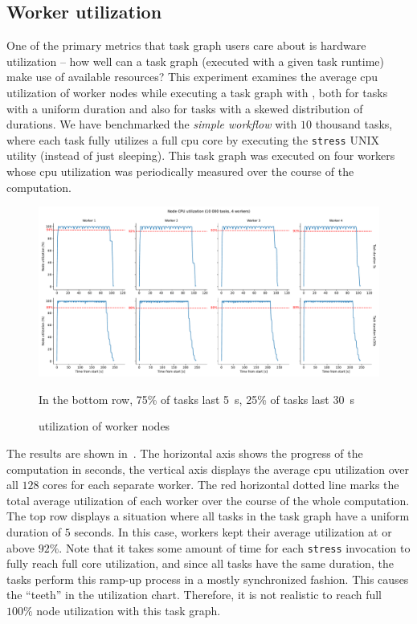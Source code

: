 \subsection{Worker  utilization}
\label{sec:hq-cpu-utilization}
One of the primary metrics that task graph users care about is hardware utilization -- how well can
a task graph (executed with a given task runtime) make use of available resources? This experiment
examines the average \gls{cpu} utilization of worker nodes while executing a task
graph with \hyperqueue{}, both for tasks with a uniform duration and also for tasks with
a skewed distribution of durations. We have benchmarked the \emph{simple workflow} with
$10$ thousand tasks, where each task fully utilizes a full
\gls{cpu} core by executing the \texttt{stress} UNIX utility (instead of just
sleeping). This task graph was executed on four workers whose
\gls{cpu} utilization was periodically measured over the course of the computation.

\begin{figure}[h]
	\centering
	\includegraphics[width=\textwidth]{imgs/hq/charts/scalability-stress-utilization}

	In the bottom row, 75\% of tasks last \SI{5}{\second}, 25\% of tasks last
	\SI{30}{\second} \caption{ utilization of \hyperqueue{} worker nodes} \label{fig:hq-cpu-utilization}
\end{figure}

The results are shown in~. The horizontal axis shows the progress of the
computation in seconds, the vertical axis displays the average \gls{cpu} utilization
over all $128$ cores for each separate worker. The red horizontal dotted line marks the
total average utilization of each worker over the course of the whole computation. The top row
displays a situation where all tasks in the task graph have a uniform duration of
$5$ seconds. In this case, \hyperqueue{} workers kept their average
utilization at or above $92\%$. Note that it takes some amount of time for each
\texttt{stress} invocation to fully reach full core utilization, and since all tasks have
the same duration, the tasks perform this ramp-up process in a mostly synchronized fashion. This
causes the ``teeth'' in the utilization chart. Therefore, it is not realistic to reach full
$100\%$ node utilization with this task graph.

